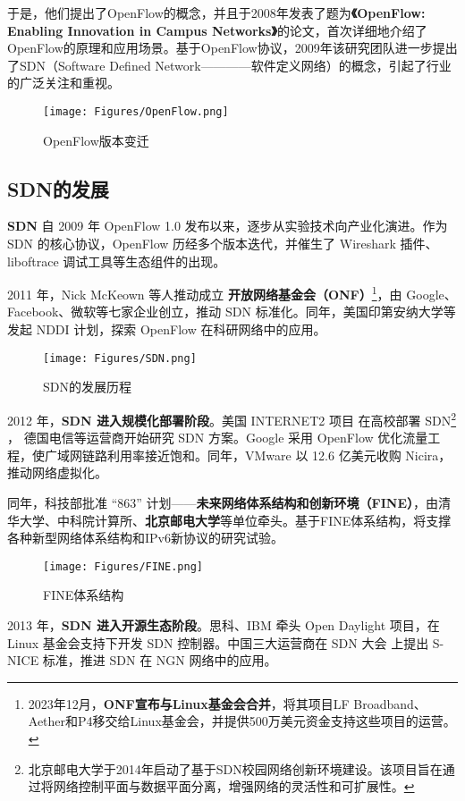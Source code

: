 \documentclass{article}
\begin{document}
于是，他们提出了OpenFlow的概念，并且于2008年发表了题为\textbf{《OpenFlow: Enabling Innovation in Campus Networks》}的论文，首次详细地介绍了OpenFlow的原理和应用场景。基于OpenFlow协议，2009年该研究团队进一步提出了SDN（Software Defined Network————软件定义网络）的概念，引起了行业的广泛关注和重视。
\begin{figure}[h]
    \centering
    \texttt{[image: Figures/OpenFlow.png]}
    \caption{OpenFlow版本变迁}
\end{figure}

\subsection{\textbf{SDN的发展}}
\quad\quad \textbf{SDN} 自 2009 年 OpenFlow 1.0 发布以来，逐步从实验技术向产业化演进。作为 SDN 的核心协议，OpenFlow 历经多个版本迭代，并催生了 Wireshark 插件、liboftrace 调试工具等生态组件的出现。

2011 年，Nick McKeown 等人推动成立 \textbf{开放网络基金会（ONF）}\footnote{2023年12月，\textbf{ONF宣布与Linux基金会合并}，将其项目LF Broadband、Aether和P4移交给Linux基金会，并提供500万美元资金支持这些项目的运营。}，由 Google、Facebook、微软等七家企业创立，推动 SDN 标准化。同年，美国印第安纳大学等发起 NDDI 计划，探索 OpenFlow 在科研网络中的应用。
\begin{figure}[h]
    \centering
    \texttt{[image: Figures/SDN.png]}
    \caption{SDN的发展历程}
\end{figure}

2012 年，\textbf{SDN 进入规模化部署阶段}。美国 INTERNET2 项目 在高校部署 SDN\footnote{北京邮电大学于2014年启动了基于SDN校园网络创新环境建设。该项目旨在通过将网络控制平面与数据平面分离，增强网络的灵活性和可扩展性。}
，
德国电信等运营商开始研究 SDN 方案。Google 采用 OpenFlow 优化流量工程，使广域网链路利用率接近饱和。同年，VMware 以 12.6 亿美元收购 Nicira，推动网络虚拟化。


同年，科技部批准 “863” 计划——\textbf{未来网络体系结构和创新环境（FINE）}，由清华大学、中科院计算所、\textbf{北京邮电大学}等单位牵头。基于FINE体系结构，将支撑各种新型网络体系结构和IPv6新协议的研究试验。


\begin{figure}[h]
    \centering
    \texttt{[image: Figures/FINE.png]}
    \caption{FINE体系结构\cite{fine}}
\end{figure}


2013 年，\textbf{SDN 进入开源生态阶段}。思科、IBM 牵头 Open Daylight 项目，在 Linux 基金会支持下开发 SDN 控制器。中国三大运营商在 SDN 大会 上提出 S-NICE 标准，推进 SDN 在 NGN 网络中的应用。
\end{document}
